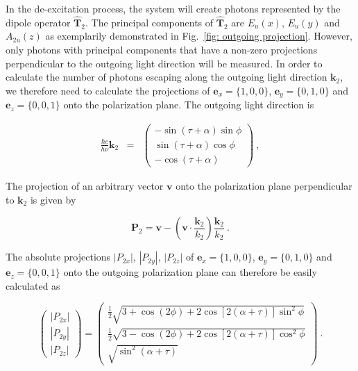 \documentclass[twocolumn,prb,twocolumn,amsmath,superscriptaddress,nofootinbib,amssymb]{revtex4-1}
\newcommand{\vect}[1]{\boldsymbol{#1}}
\begin{document}
\begin{widetext}
In the de-excitation process, the system will create photons represented by the dipole operator $\hat{\vect{T}}_2$. The principal components of $\hat{\vect{T}}_2$ are $E_u(x)$, $E_u(y)$ and $A_{2u}(z)$ as exemplarily demonstrated in Fig.~\ref{fig: outgoing projection}. However, only photons with principal components that have a non-zero projections perpendicular to the outgoing light direction will be measured. In order to calculate the number of photons escaping along the outgoing light direction $\vect{k}_2$, we therefore need to calculate the projections of $\vect{e}_x=\{1,0,0\}$, $\vect{e}_y=\{0,1,0\}$ and $\vect{e}_z=\{0,0,1\}$ onto the polarization plane. The outgoing light direction is

\begin{eqnarray}
\frac{\hbar c}{h\nu}\vect{k}_2&=&
                       \left(\begin{array}{c} -\sin(\tau+\alpha)\sin\phi\\ \sin(\tau+\alpha)\cos\phi\\-\cos(\tau+\alpha) \end{array}\right)~,
\end{eqnarray}

The projection of an arbitrary vector $\vect{v}$ onto the polarization plane perpendicular to $\vect{k}_2$ is given by

\begin{equation}
\vect{P}_2=\vect{v}-(\vect{v}\cdot\frac{\vect{k}_2}{k_2})\frac{\vect{k}_2}{k_2}~.
\end{equation}

The absolute projections $|P_{2x}|$, $|P_{2y}|$, $|P_{2z}|$ of $\vect{e}_x=\{1,0,0\}$, $\vect{e}_y=\{0,1,0\}$ and $\vect{e}_z=\{0,0,1\}$ onto the outgoing polarization plane can therefore be easily calculated as

\begin{equation}
\left(\begin{array}{c}
         |P_{2x}|\\
         |P_{2y}|\\
         |P_{2z}|
       \end{array}
\right)=
\left(\begin{array}{c}
         \frac{1}{2}\sqrt{3+\cos(2\phi)+2\cos\left[2(\alpha+\tau)\right]\sin^2\phi}\\
         \frac{1}{2}\sqrt{3-\cos(2\phi)+2\cos\left[2(\alpha+\tau)\right]\cos^2\phi}\\
         \sqrt{\sin^2(\alpha+\tau)}
       \end{array}
\right)~.
\end{equation}






\end{widetext}
\end{document}
